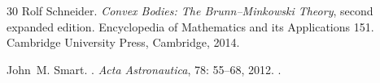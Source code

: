 \documentclass[11pt,a4paper]{article}
\theoremstyle{definition}
\begin{document}
\begin{thebibliography}{30}
Rolf Schneider.
\newblock \emph{Convex Bodies: The Brunn--Minkowski Theory}, second expanded
  edition.
\newblock Encyclopedia of Mathematics and its Applications 151. Cambridge
  University Press, Cambridge, 2014.

John~M. Smart.
.
\newblock \emph{Acta Astronautica}, 78: 55--68, 2012.
\newblock {}.

\end{thebibliography}
\end{document}
